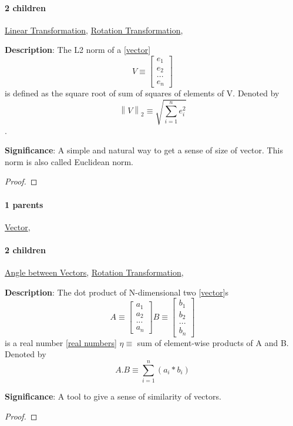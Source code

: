 \documentclass[../main.tex]{subfiles}
\newcommand{\norm}[1]{\left\lVert#1\right\rVert}
\newcommand{\bvecn}[1]{\begin{bmatrix} #1_1 \\ #1_2 \\ ... \\ #1_n \end{bmatrix}}
\begin{document}
\paragraph{2 children} \hyperref[statement:Linear Transformation]{Linear Transformation}, \hyperref[statement:Rotation Transformation]{Rotation Transformation}, 



\begin{statement}
\label{statement:L2 Norm}\hspace*{0pt}\par
\end{statement}
\textbf{Description}:
The L2 norm of a [\hyperref[statement:Vector]{vector}] \[ V \equiv \bvecn{e} \] is defined as the square root of sum of squares of elements of V. Denoted by \[ \norm{V}_2 \equiv \sqrt{ \sum_{i = 1}^{n} e_i^2 } \].
\par
{\color{magenta} \textbf{Significance}:
A simple and natural way to get a sense of size of vector.
This norm is also called Euclidean norm.
\par}
\begin{proof}
\proofbydefinition
\end{proof}\par
\paragraph{1 parents} \hyperref[statement:Vector]{Vector}, 
\paragraph{2 children} \hyperref[statement:Angle between Vectors]{Angle between Vectors}, \hyperref[statement:Rotation Transformation]{Rotation Transformation}, 



\begin{statement}
\label{statement:Dot Product}\hspace*{0pt}\par
\end{statement}
\textbf{Description}:
The dot product of N-dimensional two [\hyperref[statement:Vector]{vector}]s
\[
  A \equiv \bvecn{a}
  B \equiv \bvecn{b}
\]
is a real number [\hyperref[statement:Real Numbers]{real numbers}] $ \eta \equiv $ sum of element-wise products of A and B.
Denoted by
\[
  A . B \equiv \sum_{i = 1}^{n} (a_i * b_i)
\]
\par
{\color{magenta} \textbf{Significance}:
A tool to give a sense of similarity of vectors.
\par}
\begin{proof}
\proofbydefinition
\end{proof}\par
\end{document}
